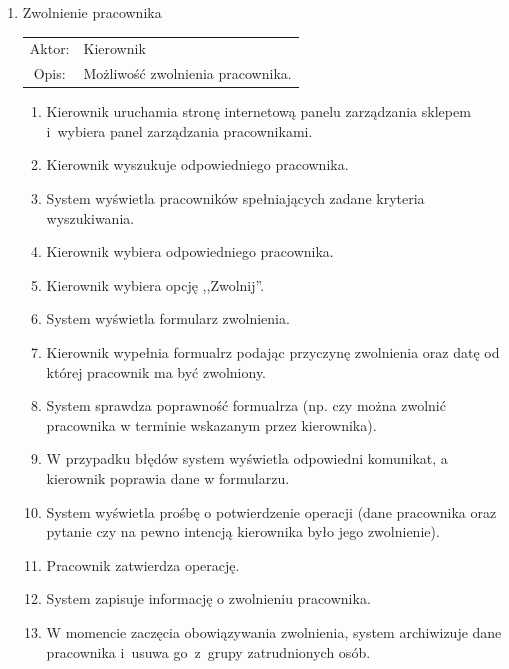 \begin{enumerate}
  \item Zwolnienie pracownika \\
  \begin{tabularx}{\linewidth}{ c X }
  Aktor: & Kierownik \\
  Opis: & Możliwość zwolnienia pracownika.\\
  \end{tabularx}
   \begin{enumerate}
    \item Kierownik uruchamia stronę internetową panelu zarządzania sklepem i~wybiera panel zarządzania pracownikami.
    \item Kierownik wyszukuje odpowiedniego pracownika.
    \item System wyświetla pracowników spełniających zadane kryteria wyszukiwania.
    \item Kierownik wybiera odpowiedniego pracownika.
    \item Kierownik wybiera opcję ,,Zwolnij''.
    \item System wyświetla formularz zwolnienia.
    \item Kierownik wypełnia formualrz podając przyczynę zwolnienia oraz datę od której pracownik ma być zwolniony.
    \item System sprawdza poprawność formualrza (np. czy można zwolnić pracownika w terminie wskazanym przez kierownika).
    \item W przypadku błędów system wyświetla odpowiedni komunikat, a kierownik poprawia dane w formularzu.
    \item System wyświetla prośbę o potwierdzenie operacji (dane pracownika oraz pytanie czy na pewno intencją kierownika
    było jego zwolnienie).
    \item Pracownik zatwierdza operację.
    \item System zapisuje informację o zwolnieniu pracownika.
    \item W momencie zaczęcia obowiązywania zwolnienia, system archiwizuje dane pracownika i~usuwa
    go~z~grupy zatrudnionych osób.
  \end{enumerate}
  

\end{enumerate}
